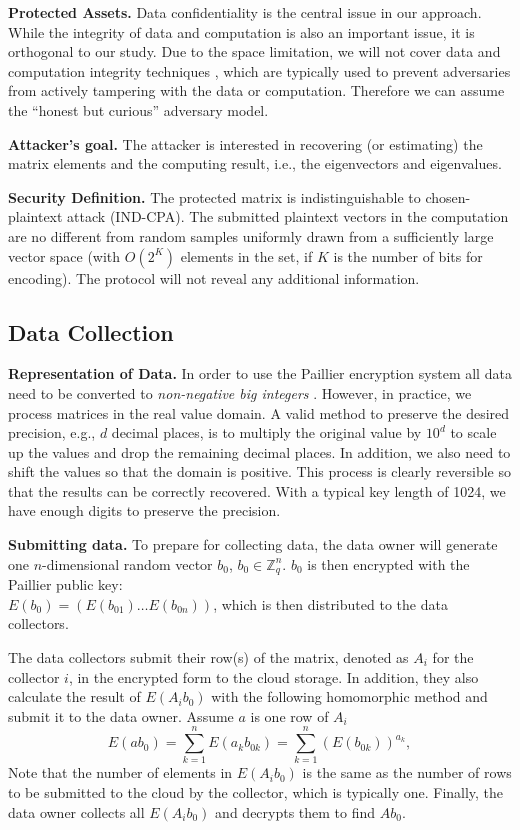 \documentclass[10pt, conference, compsocconf]{IEEEtran}
\begin{document}
\textbf{Protected Assets.} Data confidentiality is the central issue in our approach. While the integrity of data and computation is also an important issue, it is orthogonal to our study. Due to the space limitation, we will not cover data and computation integrity techniques \cite{wang11}, which are typically used to prevent adversaries from actively tampering with the data or computation. Therefore we can assume the ``honest but curious'' adversary model. 

\textbf{Attacker's goal.} The attacker is interested in recovering (or estimating) the matrix elements and the computing result, i.e., the eigenvectors and eigenvalues. 

\textbf{Security Definition.} The protected matrix is indistinguishable to chosen-plaintext attack (IND-CPA). The submitted plaintext vectors in the computation are no different from random samples uniformly drawn from a sufficiently large vector space (with $O(2^K)$ elements in the set, if $K$ is the number of bits for encoding). The protocol will not reveal any additional information.  

\subsection{Data Collection}\label{sec:data}
\textbf{Representation of Data.} In order to use the Paillier encryption system all data need to be converted to \emph{non-negative big integers} \cite{paillier99}. However, in practice, we process matrices in the real value domain. A valid method to preserve the desired precision, e.g., $d$ decimal places, is to multiply the original value by $10^d$ to scale up the values and drop the remaining decimal places. In addition, we also need to shift the values so that the domain is positive. This process is clearly reversible so that the results can be correctly recovered. With a typical key length of 1024, we have enough digits to preserve the precision. 





\textbf{Submitting data.} To prepare for collecting data, the data owner will generate one $n$-dimensional random vector $b_0$, $b_0\in \mathbb{Z}_q^n$. $b_0$ is then encrypted with the Paillier public key:\\ $E(b_0)=(E(b_{01})\ldots E(b_{0n}))$, which is then distributed to the data collectors. 

The data collectors submit their row(s) of the matrix, denoted as $A_i$ for the collector $i$, in the encrypted form to the cloud storage. In addition, they also calculate the result of $E(A_ib_0)$ with the following homomorphic method and submit it to the data owner. Assume $a$ is one row of $A_i$
\begin{equation} \label{eq:matrix-vector1}
E(ab_0) = \sum_{k=1}^n E(a_k b_{0k})
= \sum_{k=1}^n (E(b_{0k}))^{a_k},
\end{equation}
Note that the number of elements in $E(A_ib_0)$ is the same as the number of rows to be submitted to the cloud by the collector, which is typically one. Finally, the data owner collects all $E(A_ib_0)$ and decrypts them to find $Ab_0$.
\end{document}

